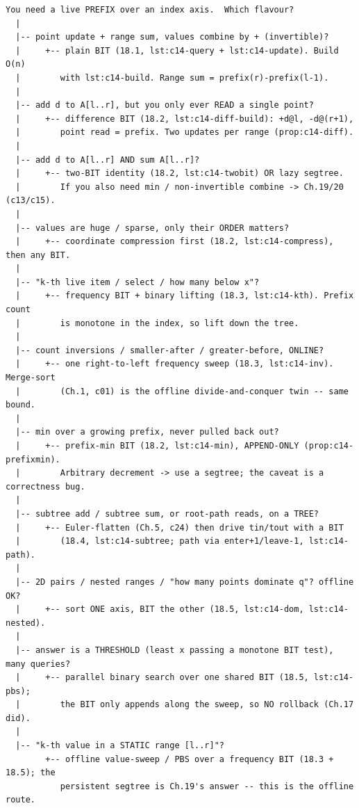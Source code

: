 \begin{lstlisting}[language={}, basicstyle=\ttfamily\small, numbers=none, frame=single]
  You need a live PREFIX over an index axis.  Which flavour?
  |
  |-- point update + range sum, values combine by + (invertible)?
  |     +-- plain BIT (18.1, lst:c14-query + lst:c14-update). Build O(n)
  |        with lst:c14-build. Range sum = prefix(r)-prefix(l-1).
  |
  |-- add d to A[l..r], but you only ever READ a single point?
  |     +-- difference BIT (18.2, lst:c14-diff-build): +d@l, -d@(r+1),
  |        point read = prefix. Two updates per range (prop:c14-diff).
  |
  |-- add d to A[l..r] AND sum A[l..r]?
  |     +-- two-BIT identity (18.2, lst:c14-twobit) OR lazy segtree.
  |        If you also need min / non-invertible combine -> Ch.19/20 (c13/c15).
  |
  |-- values are huge / sparse, only their ORDER matters?
  |     +-- coordinate compression first (18.2, lst:c14-compress), then any BIT.
  |
  |-- "k-th live item / select / how many below x"?
  |     +-- frequency BIT + binary lifting (18.3, lst:c14-kth). Prefix count
  |        is monotone in the index, so lift down the tree.
  |
  |-- count inversions / smaller-after / greater-before, ONLINE?
  |     +-- one right-to-left frequency sweep (18.3, lst:c14-inv). Merge-sort
  |        (Ch.1, c01) is the offline divide-and-conquer twin -- same bound.
  |
  |-- min over a growing prefix, never pulled back out?
  |     +-- prefix-min BIT (18.2, lst:c14-min), APPEND-ONLY (prop:c14-prefixmin).
  |        Arbitrary decrement -> use a segtree; the caveat is a correctness bug.
  |
  |-- subtree add / subtree sum, or root-path reads, on a TREE?
  |     +-- Euler-flatten (Ch.5, c24) then drive tin/tout with a BIT
  |        (18.4, lst:c14-subtree; path via enter+1/leave-1, lst:c14-path).
  |
  |-- 2D pairs / nested ranges / "how many points dominate q"? offline OK?
  |     +-- sort ONE axis, BIT the other (18.5, lst:c14-dom, lst:c14-nested).
  |
  |-- answer is a THRESHOLD (least x passing a monotone BIT test), many queries?
  |     +-- parallel binary search over one shared BIT (18.5, lst:c14-pbs);
  |        the BIT only appends along the sweep, so NO rollback (Ch.17 did).
  |
  |-- "k-th value in a STATIC range [l..r]"?
        +-- offline value-sweep / PBS over a frequency BIT (18.3 + 18.5); the
           persistent segtree is Ch.19's answer -- this is the offline route.
\end{lstlisting}


